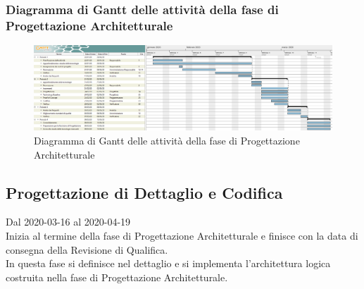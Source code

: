 \newpage
\begin{landscape}
\subsubsection{Diagramma di Gantt delle attività della fase di Progettazione Architetturale}
\pagestyle{empty}
\begin{figure}[h]
	\centering
	\includegraphics[scale=1.48]{Sezioni/DiagrammiGantt/ProgettazioneArchitetturale.png}
	\caption{Diagramma di Gantt delle attività della fase di Progettazione Architetturale}	
\end{figure}
\end{landscape}

\subsection{Progettazione di Dettaglio e Codifica}
Dal 2020-03-16 al 2020-04-19\\
Inizia al termine della fase di Progettazione Architetturale e finisce con la data di consegna della Revisione di Qualifica.\\
In questa fase si definisce nel dettaglio e si implementa l'architettura logica costruita nella fase di Progettazione Architetturale.

